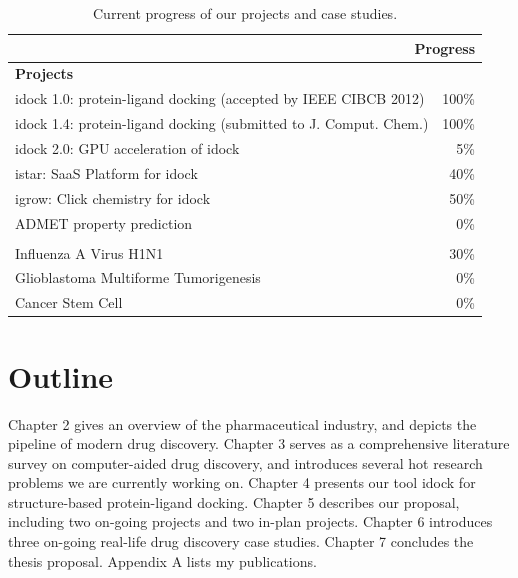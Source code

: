 \begin{table}
\centering
\begin{tabular*}
{\linewidth}
{@{\extracolsep{\fill}}lr}
\toprule
\multicolumn{2}{r}{\textbf{Progress}}\\
\midrule
\multicolumn{2}{l}{\textbf{Projects}}\\
idock 1.0: protein-ligand docking (accepted by IEEE CIBCB 2012) & 100\% \\
idock 1.4: protein-ligand docking (submitted to J. Comput. Chem.) & 100\% \\
idock 2.0: GPU acceleration of idock & 5\% \\
istar: SaaS Platform for idock & 40\% \\
igrow: Click chemistry for idock & 50\% \\
ADMET property prediction & 0\% \\
\noalign{\smallskip\smallskip}
\multicolumn{2}{l}{\textbf{Case studies}}\\
Influenza A Virus H1N1 & 30\% \\
Glioblastoma Multiforme Tumorigenesis & 0\% \\
Cancer Stem Cell & 0\% \\
\bottomrule
\end{tabular*}
\caption{Current progress of our projects and case studies.}
\label{Introduction:Progress}
\end{table}

\section{Outline}

Chapter 2 gives an overview of the pharmaceutical industry, and depicts the pipeline of modern drug discovery. Chapter 3 serves as a comprehensive literature survey on computer-aided drug discovery, and introduces several hot research problems we are currently working on. Chapter 4 presents our tool idock for structure-based protein-ligand docking. Chapter 5 describes our proposal, including two on-going projects and two in-plan projects. Chapter 6 introduces three on-going real-life drug discovery case studies. Chapter 7 concludes the thesis proposal. Appendix A lists my publications.

\chapterend